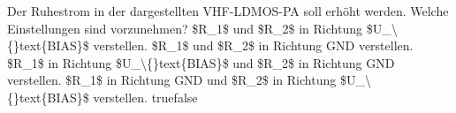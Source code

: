     {Der Ruhestrom in der dargestellten VHF-LDMOS-PA soll erhöht werden. Welche Einstellungen sind vorzunehmen?}
    {\$R\_1\$ und \$R\_2\$ in Richtung \$U\_\textbackslash\{\}text\{BIAS\}\$ verstellen.}
    {\$R\_1\$ und \$R\_2\$ in Richtung GND verstellen.}
    {\$R\_1\$ in Richtung \$U\_\textbackslash\{\}text\{BIAS\}\$ und \$R\_2\$ in Richtung GND verstellen.}
    {\$R\_1\$ in Richtung GND und \$R\_2\$ in Richtung \$U\_\textbackslash\{\}text\{BIAS\}\$ verstellen.}
    {true}{false}